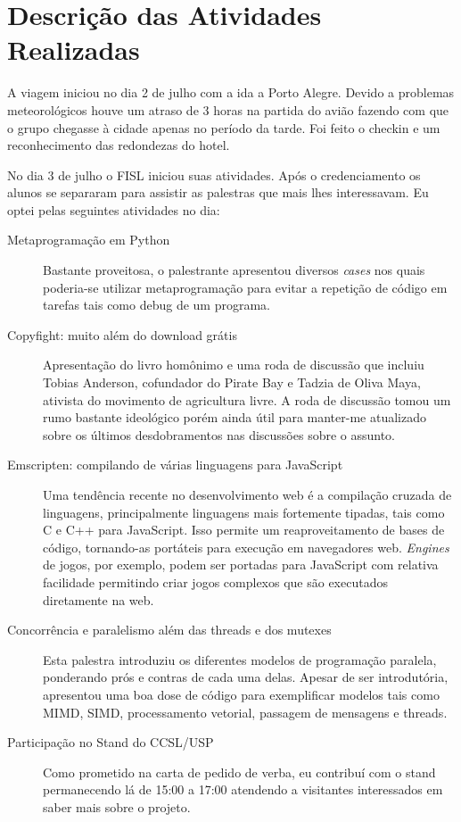 \documentclass{article}
\begin{document}
\section{Descrição das Atividades Realizadas}
A viagem iniciou no dia 2 de julho com a ida a Porto Alegre. Devido a problemas meteorológicos houve um atraso de 3 horas na partida do avião fazendo com que o grupo chegasse à cidade apenas no período da tarde. Foi feito o checkin e um reconhecimento das redondezas do hotel.

No dia 3 de julho o FISL iniciou suas atividades. Após o credenciamento os alunos se separaram para assistir as palestras que mais lhes interessavam. Eu optei pelas seguintes atividades no dia:

\begin{description}
	\item[Metaprogramação em Python] Bastante proveitosa, o palestrante apresentou diversos \emph{cases} nos quais poderia-se utilizar metaprogramação para evitar a repetição de código em tarefas tais como debug de um programa.
	\item[Copyfight: muito além do download grátis] Apresentação do livro homônimo e uma roda de discussão que incluiu Tobias Anderson, cofundador do Pirate Bay e Tadzia de Oliva Maya, ativista do movimento de agricultura livre. A roda de discussão tomou um rumo bastante ideológico porém ainda útil para manter-me atualizado sobre os últimos desdobramentos nas discussões sobre o assunto.
	\item[Emscripten: compilando de várias linguagens para JavaScript] Uma tendência recente no desenvolvimento web é a compilação cruzada de linguagens, principalmente linguagens mais fortemente tipadas, tais como C e C++ para JavaScript. Isso permite um reaproveitamento de bases de código, tornando-as portáteis para execução em navegadores web. \emph{Engines} de jogos, por exemplo, podem ser portadas para JavaScript com relativa facilidade permitindo criar jogos complexos que são executados diretamente na web.
	\item[Concorrência e paralelismo além das threads e dos mutexes] Esta palestra introduziu os diferentes modelos de programação paralela, ponderando prós e contras de cada uma delas. Apesar de ser introdutória, apresentou uma boa dose de código para exemplificar modelos tais como MIMD, SIMD, processamento vetorial, passagem de mensagens e threads.
	\item[Participação no Stand do CCSL/USP] Como prometido na carta de pedido de verba, eu contribuí com o stand permanecendo lá de 15:00 a 17:00 atendendo a visitantes interessados em saber mais sobre o projeto.
\end{description}
\end{document}
